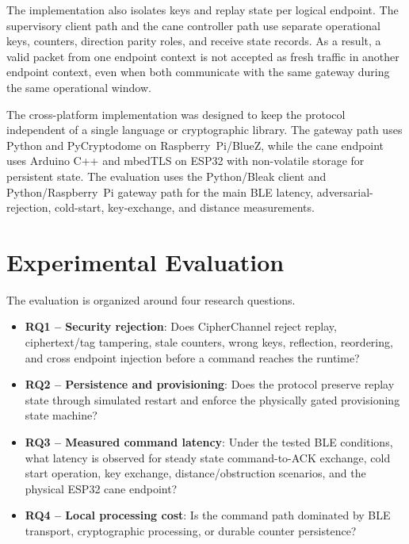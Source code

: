 \documentclass[journal]{IEEEtran}
\begin{document}
The implementation also isolates keys and replay state per logical endpoint. The supervisory client path and the cane controller path use separate operational keys, counters, direction parity roles, and receive state records. As a result, a valid packet from one endpoint context is not accepted as fresh traffic in another endpoint context, even when both communicate with the same gateway during the same operational window.

The cross-platform implementation was designed to keep the protocol independent of a single language or cryptographic library. The gateway path uses Python and PyCryptodome on Raspberry~Pi/BlueZ, while the cane endpoint uses Arduino C++ and mbedTLS on ESP32 with non-volatile storage for persistent state. The evaluation uses the Python/Bleak client and Python/Raspberry~Pi gateway path for the main BLE latency, adversarial-rejection, cold-start, key-exchange, and distance measurements.



\section{Experimental Evaluation}
\label{sec:eval}

The evaluation is organized around four research questions.

\begin{itemize}
  \item \textbf{RQ1 -- Security rejection}: Does CipherChannel reject replay, ciphertext/tag tampering, stale counters, wrong keys, reflection, reordering, and cross endpoint injection before a command reaches the runtime?

  \item \textbf{RQ2 -- Persistence and provisioning}: Does the protocol preserve replay state through simulated restart and enforce the physically gated provisioning state machine?

  \item \textbf{RQ3 -- Measured command latency}: Under the tested BLE conditions, what latency is observed for steady state command-to-ACK exchange, cold start operation, key exchange, distance/obstruction scenarios, and the physical ESP32 cane endpoint?

  \item \textbf{RQ4 -- Local processing cost}: Is the command path dominated by BLE transport, cryptographic processing, or durable counter persistence?
\end{itemize}
\end{document}

